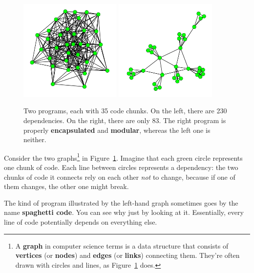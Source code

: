 \begin{figure}[ht]
\centering
\includegraphics[width=0.45\textwidth]{highDependencies.png}
\includegraphics[width=0.45\textwidth]{lowDependencies.png}
\caption{Two programs, each with 35 code chunks. On the left, there are 230
dependencies. On the right, there are only 83. The right program is properly
\textbf{encapsulated} and \textbf{modular}, whereas the left one is neither.}
\label{fig:dependencies}
\end{figure}

Consider the two graphs\footnote{A \textbf{graph} in computer science terms is
a data structure that consists of \textbf{vertices} (or \textbf{nodes}) and
\textbf{edges} (or \textbf{links}) connecting them. They're often drawn with
circles and lines, as Figure~\ref{fig:dependencies} does.} in
Figure~\ref{fig:dependencies}. Imagine that each green circle represents one
chunk of code. Each line between circles represents a dependency: the two
chunks of code it connects rely on each other \textit{not} to change, because
if one of them changes, the other one might break.

The kind of program illustrated by the left-hand graph sometimes goes by the
name \textbf{spaghetti code}. You can see why just by looking at it.
Essentially, every line of code potentially depends on everything else.

